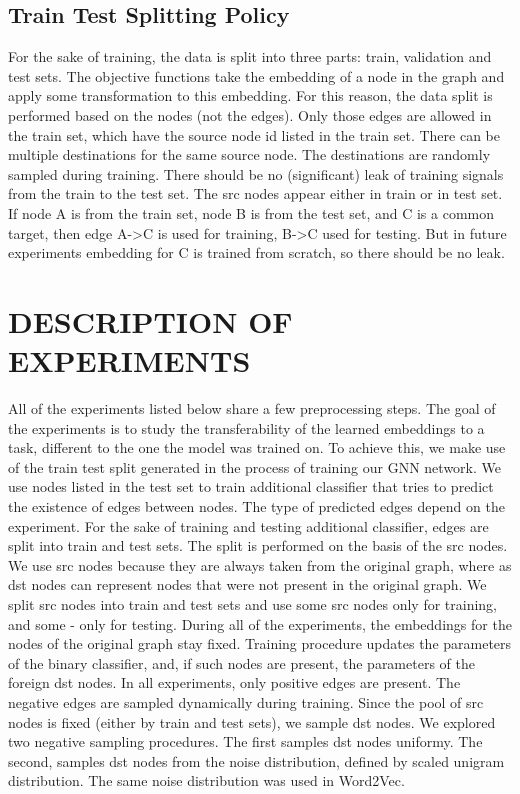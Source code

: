 \documentclass[a4paper,twoside]{article}
\begin{document}
\subsection{Train Test Splitting Policy}

For the sake of training, the data is split into three parts: train, validation and test sets. The objective functions take the embedding of a node in the graph and apply some transformation to this embedding. For this reason, the data split is performed based on the nodes (not the edges). Only those edges are allowed in the train set, which have the source node id listed in the train set. There can be multiple destinations for the same source node. The destinations are randomly sampled during training. 
There should be no (significant) leak of training signals from the train to the test set. The src nodes appear either in train or in test set. If node A is from the train set, node B is from the test set, and C is a common target, then edge A->C is used for training, B->C used for testing. But in future experiments embedding for C is trained from scratch, so there should be no leak.

\section{\uppercase{Description of experiments}}

All of the experiments listed below share a few preprocessing steps. The goal of the experiments is to study the transferability of the learned embeddings to a task, different to the one the model was trained on. To achieve this, we make use of the train test split generated in the process of training our GNN network. We use nodes listed in the test set to train additional classifier that tries to predict the existence of edges between nodes. The type of predicted edges depend on the experiment. 
For the sake of training and testing additional classifier, edges are split into train and test sets. The split is performed on the basis of the src nodes. We use src nodes because they are always taken from the original graph, where as dst nodes can represent nodes that were not present in the original graph. We split src nodes into train and test sets and use some src nodes only for training, and some - only for testing. During all of the experiments, the embeddings for the nodes of the original graph stay fixed. Training procedure updates the parameters of the binary classifier, and, if such nodes are present, the parameters of the foreign dst nodes. 
In all experiments, only positive edges are present. The negative edges are sampled dynamically during training. Since the pool of src nodes is fixed (either by train and test sets), we sample dst nodes. We explored two negative sampling procedures. The first samples dst nodes uniformy. The second, samples dst nodes from the noise distribution, defined by scaled unigram distribution. The same noise distribution was used in Word2Vec.
\end{document}
